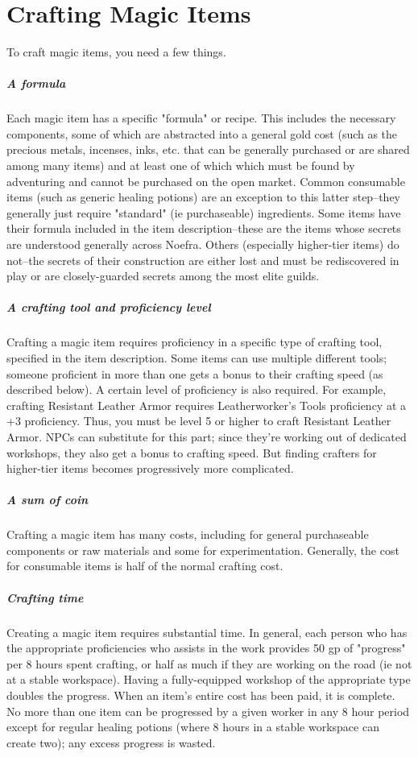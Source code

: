 \section{Crafting Magic Items}

To craft magic items, you need a few things.

\subparagraph*{A formula} Each magic item has a specific "formula" or recipe. This includes the necessary components, some of which are abstracted into a general gold cost (such as the precious metals, incenses, inks, etc. that can be generally purchased or are shared among many items) and at least one of which which must be found by adventuring and cannot be purchased on the open market. Common consumable items (such as generic healing potions) are an exception to this latter step--they generally just require "standard" (ie purchaseable) ingredients. Some items have their formula included in the item description--these are the items whose secrets are understood generally across Noefra. Others (especially higher-tier items) do not--the secrets of their construction are either lost and must be rediscovered in play or are closely-guarded secrets among the most elite guilds.

\subparagraph*{A crafting tool and proficiency level} Crafting a magic item requires proficiency in a specific type of crafting tool, specified in the item description. Some items can use multiple different tools; someone proficient in more than one gets a bonus to their crafting speed (as described below). A certain level of proficiency is also required. For example, crafting Resistant Leather Armor requires Leatherworker's Tools proficiency at a +3 proficiency. Thus, you must be level 5 or higher to craft Resistant Leather Armor. NPCs can substitute for this part; since they're working out of dedicated workshops, they also get a bonus to crafting speed. But finding crafters for higher-tier items becomes progressively more complicated.

\subparagraph*{A sum of coin} Crafting a magic item has many costs, including for general purchaseable components or raw materials and some for experimentation. Generally, the cost for consumable items is half of the normal crafting cost. 

\subparagraph*{Crafting time} Creating a magic item requires substantial time. In general, each person who has the appropriate proficiencies who assists in the work provides 50 gp of "progress" per 8 hours spent crafting, or half as much if they are working on the road (ie not at a stable workspace). Having a fully-equipped workshop of the appropriate type doubles the progress. When an item's entire cost has been paid, it is complete. No more than one item can be progressed by a given worker in any 8 hour period except for regular healing potions (where 8 hours in a stable workspace can create two); any excess progress is wasted.

